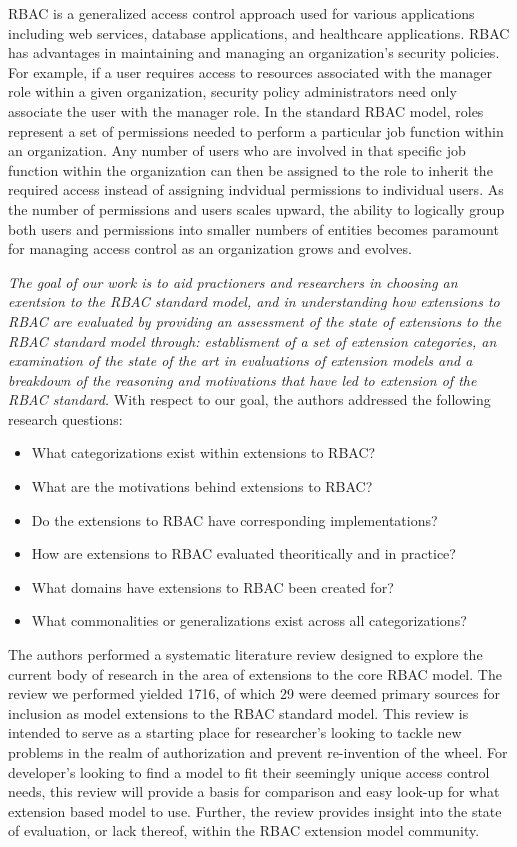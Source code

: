 RBAC is a generalized access control approach used for various applications including web services, database applications, and healthcare applications.  
RBAC has advantages in maintaining and managing an organization's security policies.  
For example, if a user requires access to resources associated with the manager role within a given organization, security policy administrators need only associate the user with the manager role.
In the standard RBAC model, roles represent a set of permissions needed to perform a particular job function within an organization.  
Any number of users who are involved in that specific job function within the organization can then be assigned to the role to inherit the required access instead of assigning indvidual permissions to individual users. 
As the number of permissions and users scales upward, the ability to logically group both users and permissions into smaller numbers of entities becomes paramount for managing access control as an organization grows and evolves.

\textit{The goal of our work is to aid practioners and researchers in choosing an exentsion to the RBAC standard model, and in understanding
how extensions to RBAC are evaluated by providing an assessment of the state of extensions to the RBAC standard model through: establisment of a 
set of extension categories, an examination of the state of the art in evaluations of extension models and a breakdown of the reasoning and motivations
that have led to extension of the RBAC standard.} With respect to our goal, the authors addressed the following research questions:

\begin{itemize}
\setlength{\itemsep}{0.25pt}
\item What categorizations exist within extensions to RBAC?
\item What are the motivations behind extensions to RBAC?
\item Do the extensions to RBAC have corresponding implementations?
\item How are extensions to RBAC evaluated theoritically and in practice?
\item What domains have extensions to RBAC been created for?
\item What commonalities or generalizations exist across all categorizations?
\end{itemize}

The authors performed a systematic literature review designed to explore the current body of research in the area of extensions to the core RBAC model.  The review we performed yielded 1716, of which 29 were deemed primary sources for inclusion as model extensions to the RBAC standard model.  This review is intended to serve as a starting place for researcher's looking to tackle new problems in the realm of authorization and prevent re-invention of the wheel. For developer's looking to find a model to fit their seemingly unique access control needs, this review will provide a basis for comparison and easy look-up for what extension based model to use.  Further, the review provides insight into the state of evaluation, or lack thereof, within the RBAC extension model community.

